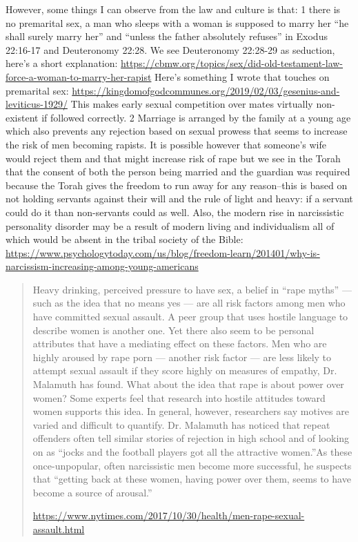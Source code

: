 \documentclass[11pt]{article}
\begin{document}
However, some things I can observe from the law and culture is that: 1 there is no premarital sex, a man who sleeps with a woman is supposed to marry her “he shall surely marry her” and “unless the father absolutely refuses” in Exodus 22:16-17 and Deuteronomy 22:28. We see Deuteronomy 22:28-29 as seduction, here's a short explanation: \url{https://cbmw.org/topics/sex/did-old-testament-law-force-a-woman-to-marry-her-rapist} Here’s something I wrote that touches on premarital sex: \url{https://kingdomofgodcommunes.org/2019/02/03/gesenius-and-leviticus-1929/} This makes early sexual competition over mates virtually non-existent if followed correctly. 2 Marriage is arranged by the family at a young age which also prevents any rejection based on sexual prowess that seems to increase the risk of men becoming rapists. It is possible however that someone’s wife would reject them and that might increase risk of rape but we see in the Torah that the consent of both the person being married and the guardian was required because the Torah gives the freedom to run away for any reason--this is based on not holding servants against their will and the rule of light and heavy: if a servant could do it than non-servants could as well. Also, the modern rise in narcissistic personality disorder may be a result of modern living and individualism all of which would be absent in the tribal society of the Bible: \url{https://www.psychologytoday.com/us/blog/freedom-learn/201401/why-is-narcissism-increasing-among-young-americans}

\begin{quote}
Heavy drinking, perceived pressure to have sex, a belief in “rape myths” — such as the idea that no means yes — are all risk factors among men who have committed sexual assault. A peer group that uses hostile language to describe women is another one.
Yet there also seem to be personal attributes that have a mediating effect on these factors. Men who are highly aroused by rape porn — another risk factor — are less likely to attempt sexual assault if they score highly on measures of empathy, Dr. Malamuth has found. What about the idea that rape is about power over women? Some experts feel that research into hostile attitudes toward women supports this idea. In general, however, researchers say motives are varied and difficult to quantify. Dr. Malamuth has noticed that repeat offenders often tell similar stories of rejection in high school and of looking on as “jocks and the football players got all the attractive women.”As these once-unpopular, often narcissistic men become more successful, he suspects that “getting back at these women, having power over them, seems to have become a source of arousal.”

\url{https://www.nytimes.com/2017/10/30/health/men-rape-sexual-assault.html}
\end{quote}
\end{document}

